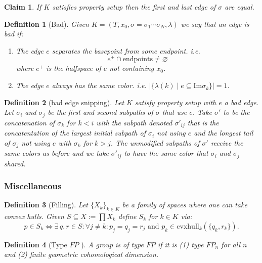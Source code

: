 \documentclass{article}
\theoremstyle{mystyle}
\newtheorem{defn}{Definition}
\newtheorem*{claim*}{Claim}
\theoremstyle{remark}
\begin{document}
\begin{claim*}
    If \(K\) satisfies property setup then the first and last edge of \(\sigma\) are equal.
\end{claim*}

\begin{defn}
    [Bad]
    Given \(K = (T, x_{0},\sigma=\sigma_{1}\cdots\sigma_{N},\lambda)\) we say that an edge is {\em bad} if:
    \begin{enumerate}
        \item The edge \(e\) separates the basepoint from some endpoint. i.e. \[e^{+} \cap \text{endpoints} \neq \varnothing\] where \(e^{+}\) is the halfspace of \(e\) not containing \(x_{0}\).
        \item The edge \(e\) always has the same color. i.e. \(\left| \{\lambda (k) \mid e \subseteq \text{Im} \sigma_{k}\} \right|=1\).
    \end{enumerate}
\end{defn}

\begin{defn}
	[bad edge snipping]
    Let \(K\) satisfy property setup with \(e\) a bad edge. Let \(\sigma_{i}\) and \(\sigma_{j}\) be the first and second subpaths of \(\sigma\) that use \(e\). Take \(\sigma '\) to be the concatenation of \(\sigma_{k}\) for \(k < i\) with the subpath denoted \(\sigma '_{ij}\) that is the concatentation of the largest initial subpath of \(\sigma_{i}\) not using \(e\) and the longest tail of \(\sigma_j\) not using \(e\) with \(\sigma_{k}\) for \(k > j\). The unmodified subpaths of \(\sigma '\) receive the same colors as before and we take \(\sigma '_{ij}\) to have the same color that \(\sigma_{i}\) and \(\sigma_{j}\) shared.
\end{defn}
\subsubsection{Miscellaneous}
\begin{defn}
	[Filling]
    Let \(\{X_{k}\}_{k \in K}\) be a family of spaces where one can take convex hulls. Given \(S \subseteq X := \prod X_{k}\) define \(S_{k}\) for \(k \in K\) via: \[p \in S_{k} \iff \exists \,q,r \in S: \forall j \neq k: p_{j} = q_{j} = r_{j} \text{ and } p_{k} \in \text{cvxhull}_k (\{q_{k} , r_{k}\}).\] 
\end{defn}
\begin{defn}
	[Type \(FP\) ]
	A group is of type \(FP\) if it is (1) type \(FP_n\) for all \(n\) and (2) finite geometric cohomological dimension.
\end{defn}
\end{document}
